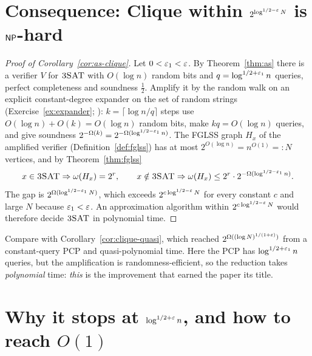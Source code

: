 \section{\texorpdfstring{Consequence: Clique within $2^{\log^{1/2-\varepsilon}N}$ is $\mathsf{NP}$-hard}{Consequence: hardness of approximating Clique}}
\label{sec:clique}

\begin{proof}[Proof of Corollary~\ref{cor:as-clique}]
Let $0<\varepsilon_1<\varepsilon$.  By Theorem~\ref{thm:as} there is a verifier $V$ for $\textsc{3SAT}$ with $O(\log n)$ random bits and $q=\log^{1/2+\varepsilon_1}n$ queries, perfect completeness and soundness $\tfrac12$.  Amplify it by
the random walk on an explicit constant-degree expander on the set of random strings (Exercise~\ref{ex:expander}; \citealp{AKS87}): $k=\lceil\log n/q\rceil$ steps use $O(\log n)+O(k)=O(\log n)$ random bits, make $kq=O(\log n)$ queries, and
give soundness $2^{-\Omega(k)}=2^{-\Omega(\log^{1/2-\varepsilon_1}n)}$.  The FGLSS graph $H_x$ of the amplified verifier (Definition~\ref{def:fglss}) has at most $2^{O(\log n)}=n^{O(1)}=:N$ vertices, and by Theorem~\ref{thm:fglss}
\[
  x\in\textsc{3SAT}\Rightarrow\omega(H_x)=2^{r},\qquad x\notin\textsc{3SAT}\Rightarrow\omega(H_x)\le2^{r}\cdot2^{-\Omega(\log^{1/2-\varepsilon_1}n)} .
\]
The gap is $2^{\Omega(\log^{1/2-\varepsilon_1}N)}$, which exceeds $2^{c\log^{1/2-\varepsilon}N}$ for every constant $c$ and large $N$ because $\varepsilon_1<\varepsilon$.  An approximation algorithm within $2^{c\log^{1/2-\varepsilon}N}$ would therefore
decide $\textsc{3SAT}$ in polynomial time.
\end{proof}

\noindent
Compare with Corollary~\ref{cor:clique-quasi}, which reached $2^{\Omega((\log N)^{1/(1+\varepsilon)})}$ from a constant-query PCP and quasi-polynomial time.  Here the PCP has $\log^{1/2+\varepsilon_1}n$ queries, but the amplification is
randomness-efficient, so the reduction takes \emph{polynomial} time: \emph{this} is the improvement that earned the paper its title.


\section{\texorpdfstring{Why it stops at $\log^{1/2+\varepsilon}n$, and how to reach $O(1)$}{Why it stops at sublogarithmic query bits, and how to reach O(1)}}
\label{sec:as-limits}

